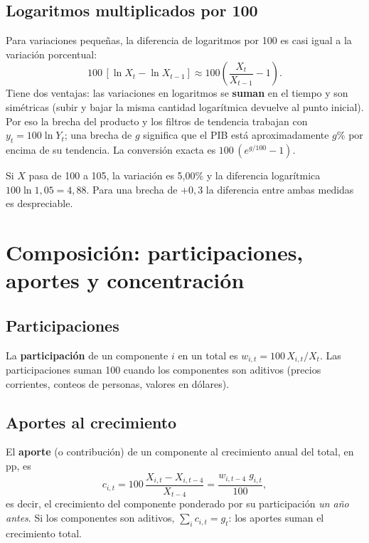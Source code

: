 \section{Logaritmos multiplicados por 100}
\label{es:f:log}
Para variaciones pequeñas, la diferencia de logaritmos por 100 es casi igual a la variación porcentual:
\[
100\,[\ln X_t-\ln X_{t-1}]\approx100\left(\frac{X_t}{X_{t-1}}-1\right).
\]
Tiene dos ventajas: las variaciones en logaritmos se \textbf{suman} en el tiempo y son simétricas (subir y bajar
la misma cantidad logarítmica devuelve al punto inicial). Por eso la brecha del producto y los filtros de tendencia
trabajan con $y_t=100\ln Y_t$; una brecha de $g$ significa que el PIB está aproximadamente $g\%$ por encima de su
tendencia. La conversión exacta es $100\,(e^{g/100}-1)$.

\begin{dato}
Si $X$ pasa de 100 a 105, la variación es 5,00\% y la diferencia logarítmica $100\ln1{,}05=4{,}88$. Para una
brecha de $+0{,}3$ la diferencia entre ambas medidas es despreciable.
\end{dato}

\chapter{Composición: participaciones, aportes y concentración}
\label{es:f:composicion}

\section{Participaciones}
La \textbf{participación} de un componente $i$ en un total es $w_{i,t}=100\,X_{i,t}/X_t$. Las participaciones
suman 100 cuando los componentes son aditivos (precios corrientes, conteos de personas, valores en dólares).

\section{Aportes al crecimiento}
\label{es:f:aportes}
El \textbf{aporte} (o contribución) de un componente al crecimiento anual del total, en pp, es
\[
c_{i,t}=100\,\frac{X_{i,t}-X_{i,t-4}}{X_{t-4}}=\frac{w_{i,t-4}\;g_{i,t}}{100},
\]
es decir, el crecimiento del componente ponderado por su participación \emph{un año antes}. Si los componentes son
aditivos, $\sum_i c_{i,t}=g_t$: los aportes suman el crecimiento total.

